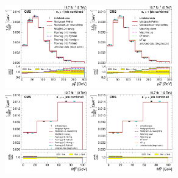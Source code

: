 \begin{figure}[hbtp]
    \centering
     \includegraphics[width=0.32\textwidth]{Chapters/07_08_09_Analysis/Images/results/fit/8TeV/WPT/central/normalised_xsection_combined_different_generators_with_bkgd_subtraction_results.pdf}\hfill
     \includegraphics[width=0.32\textwidth]{Chapters/07_08_09_Analysis/Images/results/fit/8TeV/WPT/central/normalised_xsection_combined_systematics_shifts_with_bkgd_subtraction_results.pdf}\\
     \includegraphics[width=0.32\textwidth]{Chapters/07_08_09_Analysis/Images/results/fit/8TeV/MT/central/normalised_xsection_combined_different_generators_with_bkgd_subtraction_results.pdf}\hfill
     \includegraphics[width=0.32\textwidth]{Chapters/07_08_09_Analysis/Images/results/fit/8TeV/MT/central/normalised_xsection_combined_systematics_shifts_with_bkgd_subtraction_results.pdf}\\

\end{figure}
